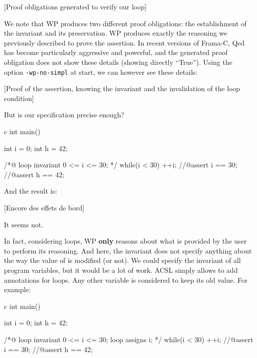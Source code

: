 \documentclass[middle]{zmdocument}
\begin{document}
[Proof obligations generated to verify our loop]


We note that WP produces two different proof obligations: the
establishment of the invariant and its preservation. WP produces exactly
the reasoning we previously described to prove the assertion. In recent
versions of Frama-C, Qed has become particularly aggressive and
powerful, and the generated proof obligation does not show these details
(showing directly ``True''). Using the option \texttt{-wp-no-simpl} at
start, we can however see these details:



[Proof of the assertion, knowing the invariant and the
  invalidation of the loop condition]


But is our specification precise enough?



\begin{CodeBlock}{c}
int main(){
  int i = 0;
  int h = 42;
  
  /*@
    loop invariant 0 <= i <= 30;
  */
  while(i < 30){
    ++i;
  }
  //@assert i == 30;
  //@assert h == 42;
}
\end{CodeBlock}



And the result is:



[Encore des effets de bord]


It seems not.





In fact, considering loops, WP \textbf{only} reasons about what is
provided by the user to perform its reasoning. And here, the invariant
does not specify anything about the way the value of  is
modified (or not). We could specify the invariant of all program
variables, but it would be a lot of work. ACSL simply allows to add
 annotations for loops. Any other variable is considered
to keep its old value. For example:



\begin{CodeBlock}{c}
int main(){
  int i = 0;
  int h = 42;
  
  /*@
    loop invariant 0 <= i <= 30;
    loop assigns i;
  */
  while(i < 30){
    ++i;
  }
  //@assert i == 30;
  //@assert h == 42;
}
\end{CodeBlock}
\end{document}
